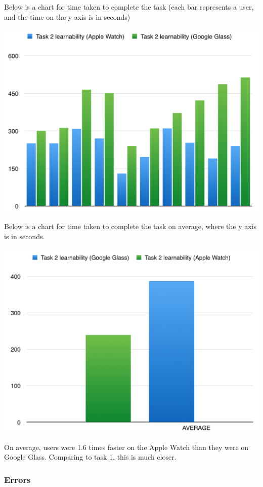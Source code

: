\documentclass[paper=a4, fontsize=11pt]{scrartcl}	%
\numberwithin{equation}{section}															%
\numberwithin{figure}{section}																%
\numberwithin{table}{section}																%
\begin{document}
Below is a chart for time taken to complete the task (each bar represents a user, and the time on the y axis is in seconds)

\includegraphics[scale=0.8]{task2learnability}


Below is a chart for time taken to complete the task on average, where the y axis is in seconds.

\includegraphics[scale=0.8]{task2learnav}

On average, users were 1.6 times faster on the Apple Watch than they were on Google Glass. Comparing to task 1, this is much closer.

\subsubsection{Errors}
\end{document}
